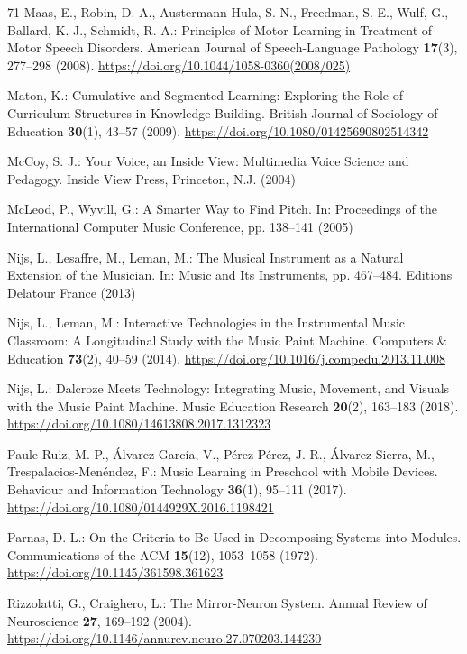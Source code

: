 \documentclass[runningheads]{llncs}
\begin{document}
\begin{thebibliography}{71}
Maas, E., Robin, D. A., Austermann Hula, S. N., Freedman, S. E., Wulf, G., Ballard, K. J., Schmidt, R. A.: Principles of Motor Learning in Treatment of Motor Speech Disorders. American Journal of Speech-Language Pathology \textbf{17}(3), 277--298 (2008). \url{https://doi.org/10.1044/1058-0360(2008/025)}

Maton, K.: Cumulative and Segmented Learning: Exploring the Role of Curriculum Structures in Knowledge-Building. British Journal of Sociology of Education \textbf{30}(1), 43--57 (2009). \url{https://doi.org/10.1080/01425690802514342}

McCoy, S. J.: Your Voice, an Inside View: Multimedia Voice Science and Pedagogy. Inside View Press, Princeton, N.J. (2004)

McLeod, P., Wyvill, G.: A Smarter Way to Find Pitch. In: Proceedings of the International Computer Music Conference, pp. 138--141 (2005)

Nijs, L., Lesaffre, M., Leman, M.: The Musical Instrument as a Natural Extension of the Musician. In: Music and Its Instruments, pp. 467--484. Editions Delatour France (2013)

Nijs, L., Leman, M.: Interactive Technologies in the Instrumental Music Classroom: A Longitudinal Study with the Music Paint Machine. Computers \& Education \textbf{73}(2), 40--59 (2014). \url{https://doi.org/10.1016/j.compedu.2013.11.008}

Nijs, L.: Dalcroze Meets Technology: Integrating Music, Movement, and Visuals with the Music Paint Machine. Music Education Research \textbf{20}(2), 163--183 (2018). \url{https://doi.org/10.1080/14613808.2017.1312323}

Paule-Ruiz, M. P., Álvarez-García, V., Pérez-Pérez, J. R., Álvarez-Sierra, M., Trespalacios-Menéndez, F.: Music Learning in Preschool with Mobile Devices. Behaviour and Information Technology \textbf{36}(1), 95--111 (2017). \url{https://doi.org/10.1080/0144929X.2016.1198421}

Parnas, D. L.: On the Criteria to Be Used in Decomposing Systems into Modules. Communications of the ACM \textbf{15}(12), 1053--1058 (1972). \url{https://doi.org/10.1145/361598.361623}

Rizzolatti, G., Craighero, L.: The Mirror-Neuron System. Annual Review of Neuroscience \textbf{27}, 169--192 (2004). \url{https://doi.org/10.1146/annurev.neuro.27.070203.144230}


\end{thebibliography}
\end{document}
